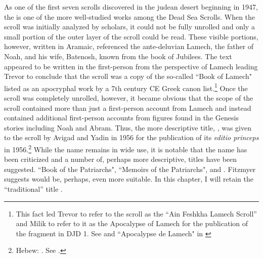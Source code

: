 As one of the first seven scrolls discovered in the judean desert beginning in 1947, the \ga is one of the more well-studied works among the Dead Sea Scrolls. When the scroll was initially analyzed by scholars, it could not be fully unrolled and only a small portion of the outer layer of the scroll could be read. These visible portions, however, written in Aramaic, referenced the ante-deluvian Lamech, the father of Noah, and his wife, Batenosh, known from the book of Jubilees. The text appeared to be written in the first-person from the perspective of Lamech leading Trevor to conclude that the scroll was a copy of the so-called ``Book of Lamech" listed as an apocryphal work by a 7th century CE Greek canon list.\footnote{This fact led Trevor to refer to the scroll as the ``Ain Feshkha Lamech Scroll'' and Milik to refer to it as the Apocalypse of Lamech for the publication of the fragment in DJD 1. See \cite[9--10]{trevor_basor1949} and ``Apocalypse de Lamech" in \cite[86--87]{djd_1}} Once the scroll was completely unrolled, however, it became obvious that the scope of the scroll contained more than just a first-person account from Lamech and instead contained additional first-person accounts from figures found in the Genesis stories including Noah and Abram. Thus, the more descriptive title, , was given to the scroll by Avigad and Yadin in 1956 for the publication of its \emph{editio princeps} in 1956.\footnote{Hebew: . See \cite{avigad-yadin1956}.} While the name \ga remains in wide use, it is notable that the name has been criticized and a number of, perhaps more descriptive, titles have been suggested. ``Book of the Patriarchs"\autocite[Hebrew: . As suggested by Mazar in][379 n. 2]{flusser_ks1956}, ``Memoirs of the Patriarchs"\autocite[as suggested by][358]{gaster1976}, and \autocite[as suggested by][14 n. 1.]{milik1959}.  Fitzmyer suggests  would be, perhaps, even more suitable.\autocite[16]{fitzmyer2004} In this chapter, I will retain the ``traditional'' title \ga.


